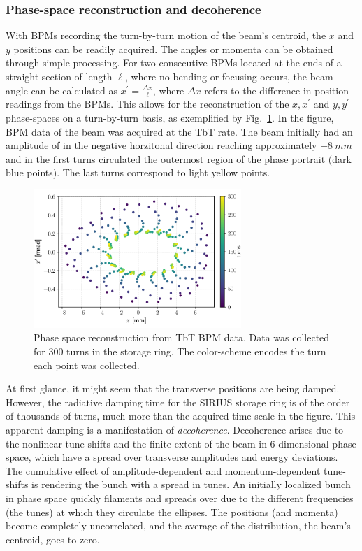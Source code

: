 \subsubsection{Phase-space reconstruction and decoherence}
With BPMs recording the turn-by-turn motion of the beam's centroid, the $x$ and $y$ positions can be readily acquired. The angles or momenta can be obtained through simple processing. For two consecutive BPMs located at the ends of a straight section of length $\ell$, where no bending or focusing occurs, the beam angle can be calculated as $x^\prime = \frac{\Delta x}{\ell}$, where $\Delta x$ refers to the difference in position readings from the BPMs. This allows for the reconstruction of the $x, x^\prime$ and $y, y^\prime$ phase-spaces on a turn-by-turn basis, as exemplified by Fig.~\ref{fig:phase_space_recons}. In the figure, BPM data of the beam was acquired at the TbT rate. The beam initially had an amplitude of in the negative horzitonal direction reaching approximately $-8~\unit{mm}$ and in the first turns circulated the outermost region of the phase portrait (dark blue points). The last turns correspond to light yellow points.
\begin{figure}
    \centering
    \includegraphics[width=0.7\textwidth]{Images/phase_space_recons.pdf}
    \caption{Phase space reconstruction from TbT BPM data. Data was collected for 300 turns in the storage ring. The color-scheme encodes the turn each point was collected.}
    \label{fig:phase_space_recons}
\end{figure}

At first glance, it might seem that the transverse positions are being damped. However, the radiative damping time for the SIRIUS storage ring is of the order of thousands of turns, much more than the acquired time scale in the figure. This apparent damping is a manifestation of \textit{decoherence}. Decoherence arises due to the nonlinear tune-shifts and the finite extent of the beam in 6-dimensional phase space, which have a spread over transverse amplitudes and energy deviations. The cumulative effect of amplitude-dependent and momentum-dependent tune-shifts is rendering the bunch with a spread in tunes. An initially localized bunch in phase space quickly filaments and spreads over due to the different frequencies (the tunes) at which they circulate the ellipses. The positions (and momenta) become completely uncorrelated, and the average of the distribution, the beam's centroid, goes to zero.
